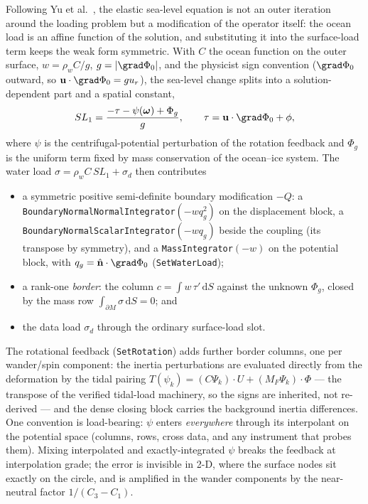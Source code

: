 \documentclass[11pt]{article}
\numberwithin{equation}{section}
\theoremstyle{remark}
\newcommand{\dS}{\,\mathrm{d}S}
\newcommand{\vu}{\mathbf{u}}
\newcommand{\vn}{\hat{\mathbf{n}}}
\newcommand{\code}[1]{\texttt{#1}}
\begin{document}
Following Yu et al.\ \cite{Yu2025}, the elastic sea-level equation is not
an outer iteration around the loading problem but a modification of the
operator itself: the ocean load is an affine function of the solution, and
substituting it into the surface-load term keeps the weak form symmetric.
With $C$ the ocean function on the outer surface, $w = \rho_wC/g$,
$g = |\grad\Phi_0|$, and the physicist sign convention
($\grad\Phi_0$ outward, so $\vu\cdot\grad\Phi_0 = gu_r$), the sea-level
change splits into a solution-dependent part and a spatial constant,
\begin{equation}
  SL_1 = \frac{-\tau - \psi(\bm\omega) + \Phi_g}{g}, \qquad
  \tau = \vu\cdot\grad\Phi_0 + \phi,
  \label{eq:sl1}
\end{equation}
where $\psi$ is the centrifugal-potential perturbation of the rotation
feedback and $\Phi_g$ is the uniform term fixed by mass conservation of
the ocean--ice system. The water load $\sigma = \rho_wC\,SL_1 +
\sigma_d$ then contributes
\begin{itemize}
\item a symmetric positive semi-definite boundary modification $-Q$: a
  \code{BoundaryNormalNormalIntegrator}$(-wq_g^2)$ on the displacement
  block, a \code{BoundaryNormalScalarIntegrator}$(-wq_g)$ beside the
  coupling (its transpose by symmetry), and a
  \code{MassIntegrator}$(-w)$ on the potential block, with
  $q_g = \vn\cdot\grad\Phi_0$ (\code{SetWaterLoad});
\item a rank-one \emph{border}: the column $c = \int w\,\tau'\dS$ against
  the unknown $\Phi_g$, closed by the mass row $\int_{\partial M}\sigma\dS
  = 0$; and
\item the data load $\sigma_d$ through the ordinary surface-load slot.
\end{itemize}
The rotational feedback (\code{SetRotation}) adds further border columns,
one per wander/spin component: the inertia perturbations are evaluated
directly from the deformation by the tidal pairing
$T(\psi_k) = (C\Psi_k)\cdot U + (M_F\Psi_k)\cdot\Phi$ --- the transpose of
the verified tidal-load machinery, so the signs are inherited, not
re-derived --- and the dense closing block carries the background inertia
differences. One convention is load-bearing: $\psi$ enters
\emph{everywhere} through its interpolant on the potential space (columns,
rows, cross data, and any instrument that probes them). Mixing
interpolated and exactly-integrated $\psi$ breaks the feedback at
interpolation grade; the error is invisible in 2-D, where the surface
nodes sit exactly on the circle, and is amplified in the wander
components by the near-neutral factor $1/(C_3 - C_1)$.
\end{document}
